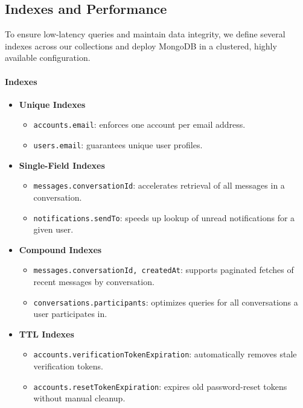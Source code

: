 \subsection{Indexes and Performance}

To ensure low-latency queries and maintain data integrity, we define several indexes across our collections and deploy MongoDB in a clustered, highly available configuration.

\paragraph{Indexes}
\begin{itemize}
  \item \textbf{Unique Indexes}
    \begin{itemize}
      \item \texttt{accounts.email}: enforces one account per email address.
      \item \texttt{users.email}: guarantees unique user profiles.
    \end{itemize}

  \item \textbf{Single-Field Indexes}
    \begin{itemize}
      \item \texttt{messages.conversationId}: accelerates retrieval of all messages in a conversation.
      \item \texttt{notifications.sendTo}: speeds up lookup of unread notifications for a given user.
    \end{itemize}

  \item \textbf{Compound Indexes}
    \begin{itemize}
      \item \texttt{messages.{conversationId, createdAt}}: supports paginated fetches of recent messages by conversation.
      \item \texttt{conversations.participants}: optimizes queries for all conversations a user participates in.
    \end{itemize}

  \item \textbf{TTL Indexes}
    \begin{itemize}
      \item \texttt{accounts.verificationTokenExpiration}: automatically removes stale verification tokens.
      \item \texttt{accounts.resetTokenExpiration}: expires old password-reset tokens without manual cleanup.
    \end{itemize}
\end{itemize}

